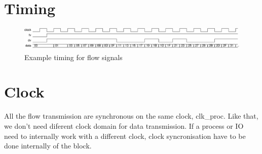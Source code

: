 \section{Timing}
\begin{figure}[h!]
\centering
\includegraphics[width=\textwidth]{wave.pdf}
\caption{Example timing for flow signals}
\end{figure}

\section{Clock}
All the flow transmission are synchronous on the same clock, clk\_proc. Like that, we don't need diferent clock domain for data transmission. If a process or IO need to internally work with a different clock, clock syncronisation have to be done internally of the block.